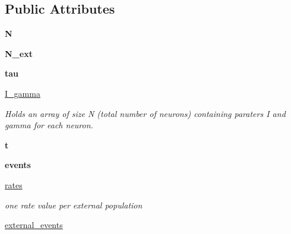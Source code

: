 \subsection*{Public Attributes}
\begin{DoxyCompactItemize}
\item 
\hypertarget{classsystem_1_1System_a9634dee6b17c69008cd4d541a0b3804e}{{\bfseries N}}\label{classsystem_1_1System_a9634dee6b17c69008cd4d541a0b3804e}

\item 
\hypertarget{classsystem_1_1System_a11da6bee25d85cd983c090bfaa7e6eeb}{{\bfseries N\-\_\-ext}}\label{classsystem_1_1System_a11da6bee25d85cd983c090bfaa7e6eeb}

\item 
\hypertarget{classsystem_1_1System_a97d1891bb9376b50b453bf9dc7fa5ef1}{{\bfseries tau}}\label{classsystem_1_1System_a97d1891bb9376b50b453bf9dc7fa5ef1}

\item 
\hyperlink{classsystem_1_1System_ab8fd44fd0fd689735185e83099511489}{I\-\_\-gamma}
\begin{DoxyCompactList}\small\item\em Holds an array of size N (total number of neurons) containing paraters I and gamma for each neuron. \end{DoxyCompactList}\item 
\hypertarget{classsystem_1_1System_ac3d311be1a233827da08d861f1ce798c}{{\bfseries t}}\label{classsystem_1_1System_ac3d311be1a233827da08d861f1ce798c}

\item 
\hypertarget{classsystem_1_1System_a31b7f9e8ccb53a6eab555bfd8ae2af12}{{\bfseries events}}\label{classsystem_1_1System_a31b7f9e8ccb53a6eab555bfd8ae2af12}

\item 
\hypertarget{classsystem_1_1System_adaa4adc9bda791e92e7b349a8d16e333}{\hyperlink{classsystem_1_1System_adaa4adc9bda791e92e7b349a8d16e333}{rates}}\label{classsystem_1_1System_adaa4adc9bda791e92e7b349a8d16e333}

\begin{DoxyCompactList}\small\item\em one rate value per external population \end{DoxyCompactList}\item 
\hypertarget{classsystem_1_1System_a049f8551f240a0b4efd269ec4fb3c425}{\hyperlink{classsystem_1_1System_a049f8551f240a0b4efd269ec4fb3c425}{external\-\_\-events}}\label{classsystem_1_1System_a049f8551f240a0b4efd269ec4fb3c425}


\end{DoxyCompactItemize}
